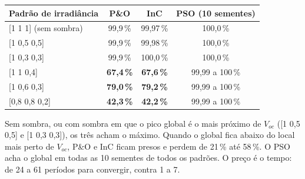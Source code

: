 \begin{resultado}
\small\centering
\begin{tabular}{@{}lccc@{}}
\toprule
Padr\~ao de irradi\^ancia & P\&O & InC & PSO (10 sementes) \\ \midrule
{[1 1 1]} (sem sombra) & 99,9\,\% & 99,97\,\% & 100,0\,\% \\
{[1 0,5 0,5]} & 99,9\,\% & 99,98\,\% & 100,0\,\% \\
{[1 0,3 0,3]} & 99,9\,\% & 100,0\,\% & 100,0\,\% \\
{[1 1 0,4]} & \textbf{67,4\,\%} & \textbf{67,6\,\%} & 99,99 a 100\,\% \\
{[1 0,6 0,3]} & \textbf{79,0\,\%} & \textbf{79,2\,\%} & 99,99 a 100\,\% \\
{[0,8 0,8 0,2]} & \textbf{42,3\,\%} & \textbf{42,2\,\%} & 99,99 a 100\,\% \\
\bottomrule
\end{tabular}
\end{resultado}

Sem sombra, ou com sombra em que o pico global \'e o mais pr\'oximo de $V_{oc}$ ([1 0,5 0,5] e [1 0,3 0,3]), os tr\^es acham o m\'aximo. Quando o global fica abaixo do local mais
perto de $V_{oc}$, P\&O e InC ficam presos e perdem de 21\,\% at\'e 58\,\%. O PSO acha o global em todas as 10 sementes de todos os padr\~oes. O pre\c{c}o \'e o tempo: de 24 a 61
per\'iodos para convergir, contra 1 a 7.
